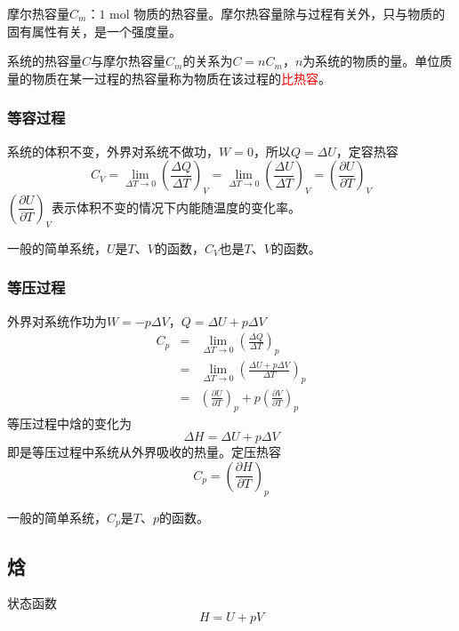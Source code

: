 \documentclass[12pt,a4paper]{article}
\begin{document}
摩尔热容量$C_m$：$1$ mol 物质的热容量。摩尔热容量除与过程有关外，只与物质的固有属性有关，是一个强度量。

系统的热容量$C$与摩尔热容量$C_m$的关系为$C = n C_m$，$n$为系统的物质的量。单位质量的物质在某一过程的热容量称为物质在该过程的\textcolor{red}{比热容}。

\subsubsection{等容过程}
系统的体积不变，外界对系统不做功，$W = 0$，所以$Q = \Delta U$，定容热容
\begin{equation}
C_V = \underset{\Delta T \rightarrow 0}\lim \left(\frac{\Delta Q}{\Delta T} \right)_V = \underset{\Delta T \rightarrow 0}\lim \left(\frac{\Delta U}{\Delta T} \right)_V = \left(\frac{\partial U}{\partial T} \right)_V
\end{equation}
$\left(\dfrac{\partial U}{\partial T} \right)_V$表示体积不变的情况下内能随温度的变化率。

一般的简单系统，$U$是$T$、$V$的函数，$C_V$也是$T$、$V$的函数。

\subsubsection{等压过程}
外界对系统作功为$W = -p\Delta V$，$Q = \Delta U +p\Delta V$
\begin{eqnarray}
\nonumber C_p &=& \underset{\Delta T \rightarrow 0}\lim \left(\frac{\Delta Q}{\Delta T} \right)_p \\
\nonumber &=& \underset{\Delta T \rightarrow 0}\lim \left(\frac{\Delta U +p\Delta V}{\Delta T} \right)_p \\
&=& \left(\frac{\partial U}{\partial T} \right)_p +p\left(\frac{\partial V}{\partial T} \right)_p
\end{eqnarray}
等压过程中焓的变化为
\begin{equation}
\Delta H= \Delta U +p\Delta V
\end{equation}
即是等压过程中系统从外界吸收的热量。定压热容
\begin{equation}
C_p =  \left(\frac{\partial H}{\partial T} \right)_p
\end{equation}

一般的简单系统，$C_p$是$T$、$p$的函数。

\subsection{焓}
状态函数
\begin{equation}
H = U +pV
\end{equation}
\end{document}
